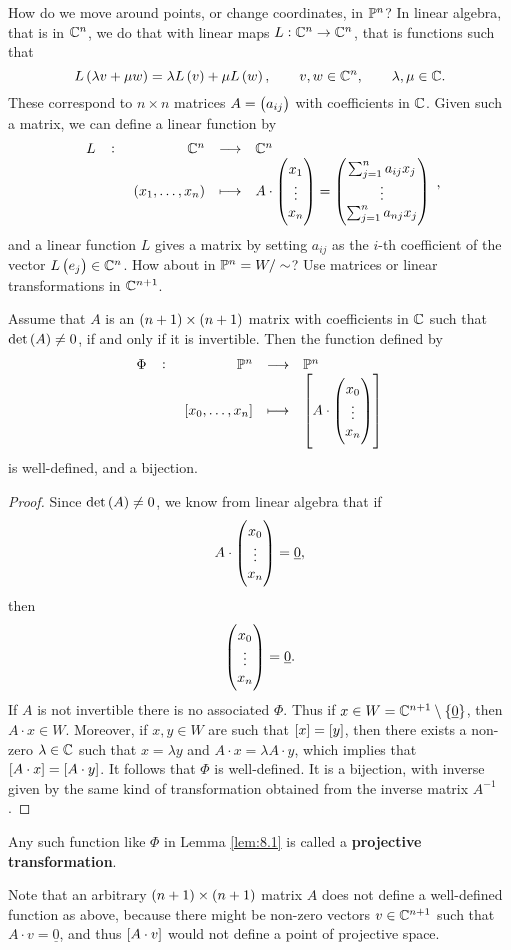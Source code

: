 How do we move around points, or change coordinates, in $ \P^n $? In linear algebra, that is in $ \C^n $, we do that with linear maps $ L : \C^n \to \C^n $, that is functions such that
$$ L\br{\lambda v + \mu w} = \lambda L\br{v} + \mu L\br{w}, \qquad v, w \in \C^n, \qquad \lambda, \mu \in \C. $$
These correspond to $ n \times n $ matrices $ A = \br{a_{ij}} $ with coefficients in $ \C $. Given such a matrix, we can define a linear function by
$$ \function[L]{\C^n}{\C^n}{\br{x_1, \dots, x_n}}{A \cdot \threebyone{x_1}{\vdots}{x_n} = \threebyone{\sum_{j = 1}^n a_{ij}x_j}{\vdots}{\sum_{j = 1}^n a_{nj}x_j}}, $$
and a linear function $ L $ gives a matrix by setting $ a_{ij} $ as the $ i $-th coefficient of the vector $ L\br{e_j} \in \C^n $. How about in $ \P^n = W / \sim $? Use matrices or linear transformations in $ \C^{n + 1} $.

\begin{lemma}
\label{lem:8.1}
Assume that $ A $ is an $ \br{n + 1} \times \br{n + 1} $ matrix with coefficients in $ \C $ such that $ \det\br{A} \ne 0 $, if and only if it is invertible. Then the function defined by
$$ \function[\Phi]{\P^n}{\P^n}{\sbr{x_0, \dots, x_n}}{\sbr{A \cdot \threebyone{x_0}{\vdots}{x_n}}} $$
is well-defined, and a bijection.
\end{lemma}

\begin{proof}
Since $ \det\br{A} \ne 0 $, we know from linear algebra that if
$$ A \cdot \threebyone{x_0}{\vdots}{x_n} = \underline{0}, $$
then
$$ \threebyone{x_0}{\vdots}{x_n} = \underline{0}. $$
If $ A $ is not invertible there is no associated $ \Phi $. Thus if $ x \in W = \C^{n + 1} \setminus \cbr{\underline{0}} $, then $ A \cdot x \in W $. Moreover, if $ x, y \in W $ are such that $ \sbr{x} = \sbr{y} $, then there exists a non-zero $ \lambda \in \C $ such that $ x = \lambda y $ and $ A \cdot x = \lambda A \cdot y $, which implies that $ \sbr{A \cdot x} = \sbr{A \cdot y} $. It follows that $ \Phi $ is well-defined. It is a bijection, with inverse given by the same kind of transformation obtained from the inverse matrix $ A^{-1} $.
\end{proof}

\begin{definition}
Any such function like $ \Phi $ in Lemma \ref{lem:8.1} is called a \textbf{projective transformation}.
\end{definition}

\begin{remark}
Note that an arbitrary $ \br{n + 1} \times \br{n + 1} $ matrix $ A $ does not define a well-defined function as above, because there might be non-zero vectors $ v \in \C^{n + 1} $ such that $ A \cdot v = \underline{0} $, and thus $ \sbr{A \cdot v} $ would not define a point of projective space.
\end{remark}

